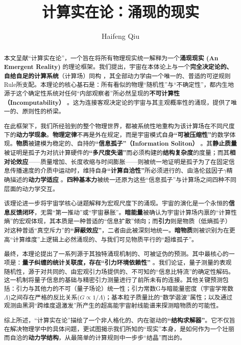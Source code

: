 \documentclass[11pt, a4paper]{article}
\title{\textbf{计算实在论：涌现的现实}}
\author{Haifeng Qiu}
\date{} %
\begin{document}
\maketitle

\begin{abstract}
本文呈献“计算实在论”，一个旨在将所有物理现实统一解释为一个\textbf{涌现现实 (An Emergent Reality)} 的理论框架。我们提出，宇宙在本体论上与一个\textbf{完全决定论的、自给自足的计算系统}（计算场）同构 \cite{Wolfram2002}，其全部动力学由一个唯一的、普适的可逆规则Rule所支配。本理论的核心基石是：所有看似的物理“随机性”与“不确定性”，都内生地源于这个确定性系统对任何“内部观察者”所必然呈现的\textbf{不可计算性（Incomputability）} \cite{Turing1936}。这为连接客观决定论的宇宙与其主观概率性的涌现，提供了唯一的、原则性的桥梁。

在此框架下，我们所经验到的整个物理世界，都被系统性地重构为该计算场在不同尺度下的\textbf{动力学现象}。\textbf{物理定律}不再是外在规定，而是宇宙模式自身\textbf{“可被压缩性”}的数学体现。\textbf{物质}被建模为稳定的、自持的\textbf{“信息孤子”（Information Soliton）} \cite{DrazinJohnson1989, Skyrme1961}。其\textbf{静止质量}被证明是孤子为对抗计算硬件的\textbf{“多尺度失谐”}而必须构建的\textbf{结构复杂度}的度量；而其\textbf{相对论效应}——质量增加、长度收缩与时间膨胀——则被统一地证明是孤子为了在固定信息传播速度的介质中运动时，维持自身\textbf{“计算自洽性”}所必须进行的、由洛伦兹因子$\gamma$精确描述的\textbf{动力学适应} \cite{Einstein1905}。\textbf{四种基本力}被统一还原为这些“信息孤子”与计算场之间四种不同层面的动力学交互。

该理论进一步将宇宙学核心谜题解释为宏观尺度下的涌现。宇宙的演化是一个永恒的\textbf{信息反馈闭环}，无需“第一推动”或“宇宙暴胀”。\textbf{暗能量}被确认为宇宙计算场内禀的“计算性熵”的宏观体现，其本质是一种普适的“信息扩散”倾向；而\textbf{引力}则是物质（低熵孤子）对这种普适“真空斥力”的\textbf{“屏蔽效应”}，二者由此被深刻地统一。\textbf{暗物质}则被识别为在更高“计算维度”上逻辑上必然涌现的、与我们可见物质平行的“超维孤子”。

最终，本理论提出了一系列源于其独特涌现机制的、可被证伪的预测。其中最核心的一项是：\textbf{量子纠缠的统计关联度，存在“引力环境依赖性”} \cite{Bell1964, Bohm1952}。我们论证，量子测量的表观随机性，源于对共同的、由宏观引力场提供的、不可知的“信息比特流”的确定性解码。这一机制将量子信息的基础与精密引力测量进行了前所未有的连接。其他关键预测包括：引力与其他力的不可（量子场论）统一性；引力常数G与暗能量密度（宇宙学常数$\Lambda$)之间存在严格的反比关系($G \propto 1/\Lambda$)；基本粒子质量比的“数学谐波”属性；以及通过观测由黑洞“跨维度退激发”所产生的超高能宇宙射线能谱来探测暗物质的可能性。

综上所述，“计算实在论”描绘了一个非人格化的、内在驱动的\textbf{“结构求解器”}。它不仅旨在解决物理学中的具体问题，更试图揭示我们所知的“现实”本身，是如何作为一个壮丽而自洽的\textbf{动力学结构}，从最简单的计算规则中一步步“结晶”而出的。
\end{abstract}
\end{document}
